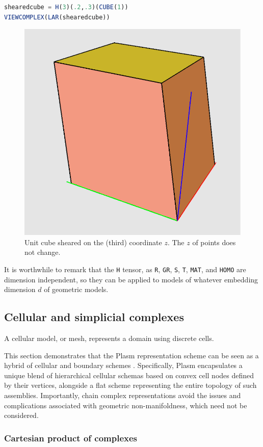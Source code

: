 \documentclass{juliacon}
\begin{document}
\begin{lstlisting}[language = Julia,numbers=none,label={lst:exmpl6},
caption={3D shearing of the unit cube.}
]
shearedcube = H(3)(.2,.3)(CUBE(1))
VIEWCOMPLEX(LAR(shearedcube))
\end{lstlisting}
\begin{figure}[htbp] %
\includegraphics[width=0.5\linewidth]{figs/shearing3D}
\caption{Unit cube sheared on the (third) coordinate $z$. The $z$ of points does not change.}
\label{fig:4:shear:02}
\end{figure}
It is worthwhile to remark that the {\tt H} tensor, as {\tt R}, {\tt GR}, {\tt S}, 
{\tt T}, {\tt MAT}, and {\tt HOMO} are dimension independent, so they can be applied to models of whatever embedding dimension $d$ of geometric models. 


\subsection{Cellular and simplicial complexes}
\label{subsec:title_auth}

A cellular model, or mesh, represents a domain using discrete cells.

This section demonstrates that the Plasm representation scheme can be seen as a hybrid of cellular and boundary schemes \cite{Requicha:80}. Specifically, Plasm encapsulates a unique blend of hierarchical cellular schemas based on convex cell nodes defined by their vertices, alongside a flat scheme representing the entire topology of such assemblies. Importantly, chain complex representations avoid the issues and complications associated with geometric non-manifoldness, which need not be considered.

\subsubsection*{Cartesian product of complexes}
\end{document}
